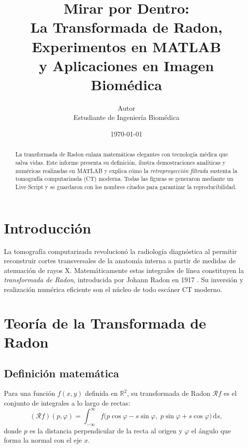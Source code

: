 \documentclass[11pt]{article}
\title{Mirar por Dentro:\\
       La Transformada de Radon, Experimentos en MATLAB\\
       y Aplicaciones en Imagen Biomédica}
\author{Autor\\
        Estudiante de Ingeniería Biomédica}
\date{\today}
\begin{document}
\maketitle

\begin{abstract}
La transformada de Radon enlaza matemáticas elegantes con tecnología
médica que salva vidas.  Este informe presenta su definición, ilustra
demostraciones analíticas y numéricas realizadas en MATLAB y explica
cómo la \emph{retroproyección filtrada} sustenta la tomografía
computarizada (CT) moderna.  Todas las figuras se generaron mediante un
Live Script y se guardaron con los nombres citados para garantizar la
reproducibilidad.
\end{abstract}

\tableofcontents
\bigskip
\section{Introducción}

La tomografía computarizada revolucionó la radiología diagnóstica al
permitir reconstruir cortes transversales de la anatomía interna a
partir de medidas de atenuación de rayos X.  Matemáticamente estas
integrales de línea constituyen la \emph{transformada de Radon},
introducida por Johann Radon en 1917 \cite{Radon1917}.  Su inversión y
realización numérica eficiente son el núcleo de todo escáner CT moderno.

\section{Teoría de la Transformada de Radon}

\subsection{Definición matemática}

Para una función $f(x,y)$ definida en $\mathbb R^{2}$, su transformada
de Radon $\mathcal Rf$ es el conjunto de integrales a lo largo de
rectas:
\begin{equation}
  (\mathcal R f)(p,\varphi)
  =
    \int_{-\infty}^{\infty}
      f\!\bigl(p\cos\varphi - s\sin\varphi,\;
               p\sin\varphi + s\cos\varphi\bigr)\,\mathrm ds,
  \label{eq:radon-def}
\end{equation}
donde $p$ es la distancia perpendicular de la recta al origen y
$\varphi$ el ángulo que forma la normal con el eje $x$.
\end{document}
